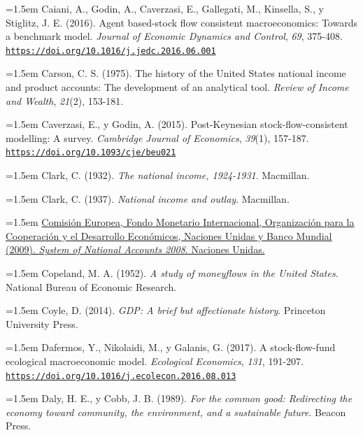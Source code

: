 \documentclass[10pt,a4paper]{article}
\begin{document}
\noindent\hangindent=1.5em Caiani, A., Godin, A., Caverzasi, E., Gallegati, M., Kinsella, S., y Stiglitz, J. E. (2016). Agent based-stock flow consistent macroeconomics: Towards a benchmark model. \textit{Journal of Economic Dynamics and Control}, \textit{69}, 375-408. \href{https://doi.org/10.1016/j.jedc.2016.06.001}{\nolinkurl{https://doi.org/10.1016/j.jedc.2016.06.001}}

\noindent\hangindent=1.5em Carson, C. S. (1975). The history of the United States national income and product accounts: The development of an analytical tool. \textit{Review of Income and Wealth}, \textit{21}(2), 153-181.

\noindent\hangindent=1.5em Caverzasi, E., y Godin, A. (2015). Post-Keynesian stock-flow-consistent modelling: A survey. \textit{Cambridge Journal of Economics}, \textit{39}(1), 157-187. \href{https://doi.org/10.1093/cje/beu021}{\nolinkurl{https://doi.org/10.1093/cje/beu021}}

\noindent\hangindent=1.5em Clark, C. (1932). \textit{The national income, 1924-1931}. Macmillan.

\noindent\hangindent=1.5em Clark, C. (1937). \textit{National income and outlay}. Macmillan.

\noindent\hangindent=1.5em \href{https://unstats.un.org/unsd/nationalaccount/docs/SNA2008.pdf}{Comisión Europea, Fondo Monetario Internacional, Organización para la Cooperación y el Desarrollo Económicos, Naciones Unidas y Banco Mundial (2009). \textit{System of National Accounts 2008}. Naciones Unidas.}

\noindent\hangindent=1.5em Copeland, M. A. (1952). \textit{A study of moneyflows in the United States}. National Bureau of Economic Research.

\noindent\hangindent=1.5em Coyle, D. (2014). \textit{GDP: A brief but affectionate history}. Princeton University Press.

\noindent\hangindent=1.5em Dafermos, Y., Nikolaidi, M., y Galanis, G. (2017). A stock-flow-fund ecological macroeconomic model. \textit{Ecological Economics}, \textit{131}, 191-207. \href{https://doi.org/10.1016/j.ecolecon.2016.08.013}{\nolinkurl{https://doi.org/10.1016/j.ecolecon.2016.08.013}}

\noindent\hangindent=1.5em Daly, H. E., y Cobb, J. B. (1989). \textit{For the common good: Redirecting the economy toward community, the environment, and a sustainable future}. Beacon Press.
\end{document}
